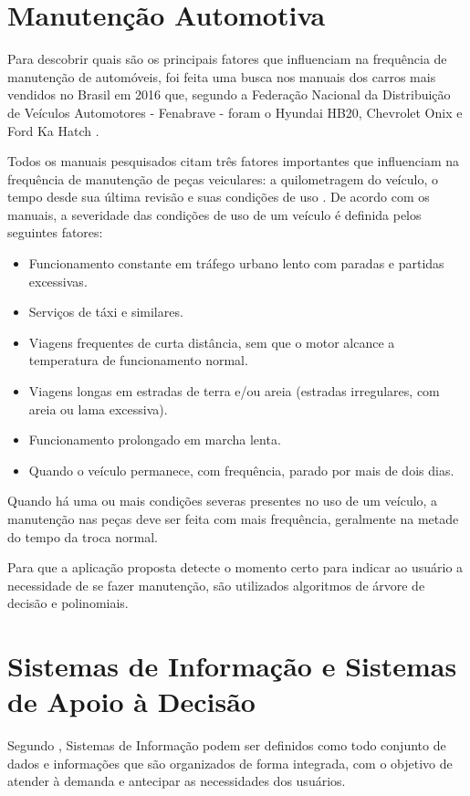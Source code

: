 \documentclass[12pt]{article}
\begin{document}
\section{Manutenção Automotiva} \label{sec:manutencao}
Para descobrir quais são os principais fatores que influenciam na frequência de
manutenção de automóveis, foi feita uma busca nos manuais dos carros mais vendidos
no Brasil em 2016 que, segundo a Federação Nacional da Distribuição de Veículos
Automotores - Fenabrave - foram o Hyundai HB20, Chevrolet Onix e Ford Ka Hatch
\cite{fenabrave}.

Todos os manuais pesquisados citam três fatores importantes que influenciam na
frequência de manutenção de peças veiculares: a quilometragem do veículo, o
tempo desde sua última revisão e suas condições de uso \cite{manualhyundai,
manualonix, manualka}. De acordo com os manuais, a severidade das condições de
uso de um veículo é definida pelos seguintes fatores:

\begin{itemize}
  \item Funcionamento constante em tráfego urbano lento com paradas e partidas
  excessivas.
  \item Serviços de táxi e similares.
  \item Viagens frequentes de curta distância, sem que o motor alcance a
  temperatura de funcionamento normal.
  \item Viagens longas em estradas de terra e/ou areia (estradas irregulares,
  com areia ou lama excessiva).
  \item Funcionamento prolongado em marcha lenta.
  \item Quando o veículo permanece, com frequência, parado por mais de dois
  dias.
\end{itemize}

Quando há uma ou mais condições severas presentes no uso de um veículo, a
manutenção nas peças deve ser feita com mais frequência, geralmente na metade do
tempo da troca normal.

Para que a aplicação proposta detecte o momento certo para indicar ao usuário a
necessidade de se fazer manutenção, são utilizados algoritmos de árvore de
decisão e polinomiais.

\section{Sistemas de Informação e Sistemas de Apoio à Decisão} \label{sec:sisad}
Segundo , Sistemas de Informação podem ser definidos
como todo conjunto de dados e informações que são organizados de forma
integrada, com o objetivo de atender à demanda e antecipar as necessidades dos
usuários.
\end{document}

